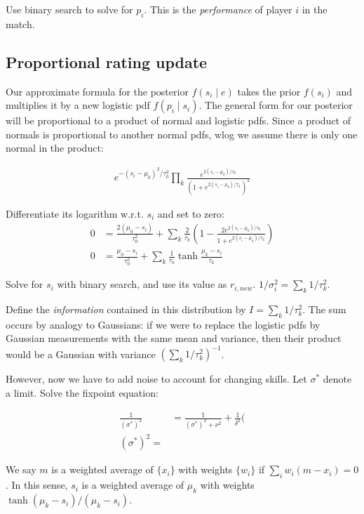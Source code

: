 \documentclass{article}
\begin{document}
Use binary search to solve for $p_i$. This is the \emph{performance} of player $i$ in the match.

\subsection{Proportional rating update}

Our approximate formula for the posterior $f(s_i \mid e)$ takes the prior $f(s_i)$ and multiplies it by a new logistic pdf $f(p_i\mid s_i)$. The general form for our posterior will be proportional to a product of normal and logistic pdfs. Since a product of normals is proportional to another normal pdfs, wlog we assume there is only one normal in the product:

\begin{align}
e^{-(s_i-\mu_0)^2/\tau_0^2} \prod_k \frac { e^{2(s_i-\mu_k)/\tau_k} } { \left(1 + e^{2(s_i-\mu_k)/\tau_k} \right)^2 }
\end{align}

Differentiate its logarithm w.r.t. $s_i$ and set to zero:
\begin{align}
0 &= \frac{2(\mu_0-s_i)}{\tau_0^2} + \sum_k \frac{2}{\tau_k}\left( 1 - \frac {2e^{2(s_i-\mu_k)/\tau_k}} {1 + e^{2(s_i-\mu_k)/\tau_k}} \right)
\\0 &=  \frac{\mu_0-s_i}{\tau_0^2} + \sum_k \frac{1}{\tau_k} \tanh \frac {\mu_k-s_i} {\tau_k}
\end{align}

Solve for $s_i$ with binary search, and use its value as $r_{i,new}$. $1/\sigma_i^2 = \sum_k 1/\tau_k^2$.

Define the \emph{information} contained in this distribution by $I = \sum_k 1/\tau_k^2$. The sum occurs by analogy to Gaussians: if we were to replace the logistic pdfs by Gaussian measurements with the same mean and variance, then their product would be a Gaussian with variance $(\sum_k 1/\tau_k^2)^{-1}$.

However, now we have to add noise to account for changing skills. Let $\sigma^*$ denote a limit. Solve the fixpoint equation:

\begin{align}
\frac{1}{(\sigma^*)^2} &= \frac{1}{(\sigma^*)^2+\nu^2} + \frac{1}{\delta^2}(
\\(\sigma^*)^2 = 
\end{align}

We say $m$ is a weighted average of $\{x_i\}$ with weights $\{w_i\}$ if $\sum_i w_i(m-x_i) = 0$. In this sense, $s_i$ is a weighted average of $\mu_k$ with weights $\tanh(\mu_k-s_i) / (\mu_k-s_i)$.
\end{document}
